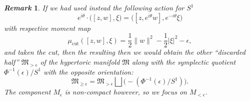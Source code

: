 \documentclass[11pt]{amsart}
\newtheorem{remark}{\it Remark\/}
\newcommand{\m}{\mu}
\newcommand{\e}{\epsilon}
\newcommand{\mf}[1]{\mathfrak{#1}}
\begin{document}
\begin{remark}
	If we had used instead the following action for $S^{1}$
	\begin{equation*}
		e^{i\theta}\cdot \big( [z,w], \xi \big) = \big( [z,e^{i\theta}w], e^{-i\theta}\xi \big)
	\end{equation*}
	with respective moment map
	\begin{equation*}
		\m_{\text{cut}} ([z,w],\xi) = \frac{1}{2}\|w\|^{2} - \frac{1}{2}|\xi|^{2} - \e,
	\end{equation*}
	and taken the cut, then the resulting then we would obtain the other ``discarded half'' $\mf{M}_{>\e}$ of the hypertoric manifold $\mf{M}$ along with the symplectic quotient $\Phi^{-1}(\e)/S^{1}$ with the opposite orientation:
	\begin{equation*}
		\mf{M}_{\geq \e} = \mf{M}_{> \e} \bigsqcup \Big(-(\Phi^{-1}(\e)/S^{1})\Big).
	\end{equation*}
	The component $M_{\e}$ is non-compact however, so we focus on $M_{<\e}$.
\end{remark}



























\providecommand{\bysame}{\leavevmode\hbox to3em{\hrulefill}\thinspace}
\providecommand{\href}[2]{#2}



\end{document}
